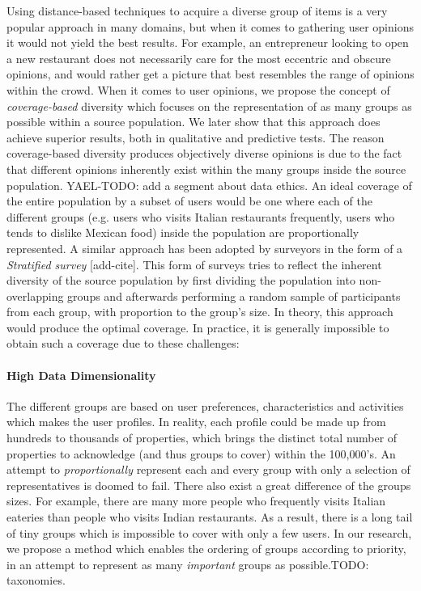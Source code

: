 Using distance-based techniques to acquire a diverse group of items is a very popular approach in many domains, but when it comes to gathering user opinions it would not yield the best results. For example, an entrepreneur looking to open a new restaurant does not necessarily care for the most eccentric and obscure opinions, and would rather get a picture that best resembles the range of opinions within the crowd.
When it comes to user opinions, we propose the concept of \emph{coverage-based} diversity which focuses on the representation of as many groups as possible within a source population. We later show that this approach does achieve superior results, both in qualitative and predictive tests. The reason coverage-based diversity produces objectively diverse opinions is due to the fact that different opinions inherently exist within the many groups inside the source population.
YAEL-TODO: add a segment about data ethics.
An ideal coverage of the entire population by a subset of users would be one where each of the different groups (e.g. users who visits Italian restaurants frequently, users who tends to dislike Mexican food) inside the population are proportionally represented. A similar approach has been adopted by surveyors in the form of a \emph{Stratified survey} [add-cite]. This form of surveys tries to reflect the inherent diversity of the source population by first dividing the population into non-overlapping groups and afterwards performing a random sample of participants from each group, with proportion to the group's size. In theory, this approach would produce the optimal coverage. In practice, it is generally impossible to obtain such a coverage due to these challenges:

\paragraph*{High Data Dimensionality} The different groups are based on user preferences, characteristics and activities which makes the user profiles. In reality, each profile could be made up from hundreds to thousands of properties, which brings the distinct total number of properties to acknowledge (and thus groups to cover) within the 100,000's. An attempt to \emph{proportionally} represent each and every group with only a selection of representatives is doomed to fail. There also exist a great difference of the groups sizes. For example, there are many more people who frequently visits Italian eateries than people who visits Indian restaurants. As a result, there is a long tail of tiny groups which is impossible to cover with only a few users. In our research, we propose a method which enables the ordering of groups according to priority, in an attempt to represent as many \emph{important} groups as possible.TODO: taxonomies.

